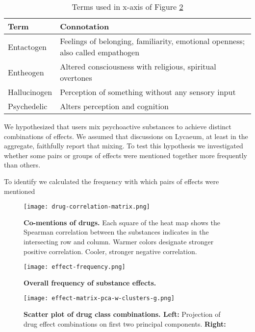 \documentclass{article}
\begin{document}
\begin{table}[h]
\centering
\begin{tabular}{@{}ll@{}}
\toprule
Term         & Connotation                                                                    \\ \midrule
Entactogen   & Feelings of belonging, familiarity, emotional openness; also called empathogen \\
Entheogen    & Altered consciousness with religious, spiritual overtones                      \\
Hallucinogen & Perception of something without any sensory input                              \\
Psychedelic  & Alters perception and cognition                                                \\ \bottomrule
\end{tabular}
\caption{Terms used in x-axis of Figure \ref{fig:effect-f}}
\label{tab:effect-defs}
\end{table}

   We hypothesized that users mix psychoactive substances to achieve distinct combinations of effects. We assumed that discussions on Lycaeum, at least in the aggregate, faithfully report that mixing. To test this hypothesis we investigated whether some pairs or groups of effects were mentioned together more frequently than others.
   
     To identify  we calculated the frequency with which pairs of effects were mentioned 
   
   


\begin{figure}[h]
\centering
\texttt{[image: drug-correlation-matrix.png]}
\caption{\textbf{Co-mentions of drugs.} Each square of the heat map shows the Spearman correlation between the substances indicates in the intersecting row and column. Warmer colors designate stronger positive correlation. Cooler, stronger negative correlation. }
\label{fig:drug-drug-correlation}
\end{figure}

\begin{figure}[h]
\centering
\texttt{[image: effect-frequency.png]}
\caption{\textbf{Overall frequency of substance effects.}}
\label{fig:effect-f}
\end{figure}

\begin{figure}[h]
\centering
\texttt{[image: effect-matrix-pca-w-clusters-g.png]}
\caption{\textbf{Scatter plot of drug class combinations. Left: }Projection of drug effect combinations on first two principal components. \textbf{Right:}}
\label{fig:pca}
\end{figure}



\end{document}
